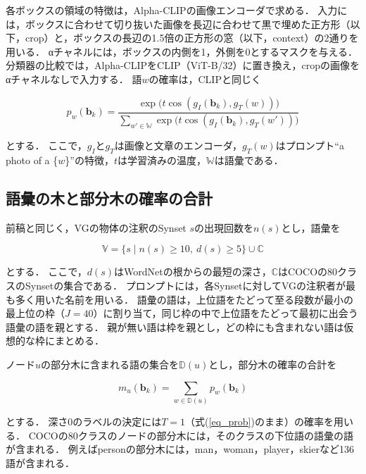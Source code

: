 各ボックスの領域の特徴は，Alpha-CLIPの画像エンコーダで求める．
入力には，ボックスに合わせて切り抜いた画像を長辺に合わせて黒で埋めた正方形（以下，crop）と，ボックスの長辺の1.5倍の正方形の窓（以下，context）の2通りを用いる．
αチャネルには，ボックスの内側を1，外側を0とするマスクを与える．
分類器の比較では，Alpha-CLIPをCLIP（ViT-B/32）に置き換え，cropの画像をαチャネルなしで入力する．
語$ w $の確率は，CLIPと同じく

\begin{equation}
    p_w({\mathbf b}_k) = \frac{\exp\bigl(t \cos(g_I({\mathbf b}_k), g_T(w))\bigr)}{\sum_{w' \in {\mathbb W}} \exp\bigl(t \cos(g_I({\mathbf b}_k), g_T(w'))\bigr)}
    \label{eq_prob}
\end{equation}

\noindent
とする．
ここで，$ g_I $と$ g_T $は画像と文章のエンコーダ，$ g_T(w) $はプロンプト``a photo of a \{$w$\}''の特徴，$ t $は学習済みの温度，$ {\mathbb W} $は語彙である．

\subsection{語彙の木と部分木の確率の合計}\label{sec_vocab}
前稿\cite{ref_prevVG}と同じく，VGの物体の注釈のSynset $ s $の出現回数を$ n(s) $とし，語彙を

\begin{equation}
    {\mathbb V} = \{ s \mid n(s) \geq 10,\ d(s) \geq 5 \} \cup {\mathbb C}
    \label{eq_vocab}
\end{equation}

\noindent
とする．
ここで，$ d(s) $はWordNetの根からの最短の深さ，$ {\mathbb C} $はCOCOの80クラスのSynsetの集合である．
プロンプトには，各Synsetに対してVGの注釈者が最も多く用いた名前を用いる．
語彙の語は，上位語をたどって至る段数が最小の最上位の枠（$ J = 40 $）に割り当て，同じ枠の中で上位語をたどって最初に出会う語彙の語を親とする．
親が無い語は枠を親とし，どの枠にも含まれない語は仮想的な枠にまとめる．

ノード$ u $の部分木に含まれる語の集合を$ {\mathbb D}(u) $とし，部分木の確率の合計を

\begin{equation}
    m_u({\mathbf b}_k) = \sum_{w \in {\mathbb D}(u)} p_w({\mathbf b}_k)
    \label{eq_mass}
\end{equation}

\noindent
とする．
深さ0のラベルの決定には$ T = 1 $（式(\ref{eq_prob})のまま）の確率を用いる．
COCOの80クラスのノードの部分木には，そのクラスの下位語の語彙の語が含まれる．
例えばpersonの部分木には，man，woman，player，skierなど136語が含まれる．


